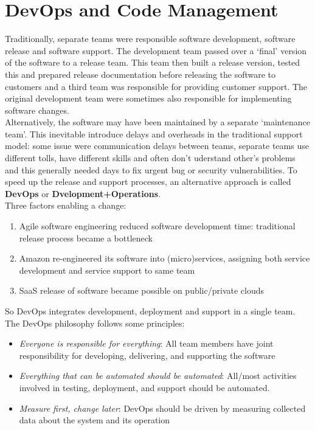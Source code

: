 \documentclass[10pt,a4paper]{report}
\begin{document}
\chapter{DevOps and Code Management}
Traditionally, separate teams were responsible software development, software release and software support.
The development team passed over a ‘final’ version of the software to a release team. This team then built a release version, tested this and prepared release documentation before releasing the software to
customers and a third team was responsible for providing customer support.
The original development team were sometimes also responsible for implementing software changes.
\\
Alternatively, the software may have been maintained by a separate ‘maintenance team’. This inevitable introduce delays and overheads in the traditional support model: some issue were communication delays between teams, separate teams use different tolls, have different skills and often don't uderstand other's problems and this generally needed days to fix urgent bug or security vulnerabilities. To speed up the release and support processes, an alternative approach is called \textbf{DevOps} or \textbf{Dvelopment+Operations}.\\
Three factors enabling a change:
\begin{enumerate}
	\item Agile software engineering reduced software development time: traditional release process became a bottleneck
	\item Amazon re-engineered its software into (micro)services, assigning both service development and service support to same team
	\item SaaS release of software became possible on public/private clouds
\end{enumerate}
So DevOps integrates development, deployment and support in a single team. The DevOps philosophy follows some principles:
\begin{itemize}
	\item \textit{Everyone is responsible for everything}: All team members have joint responsibility for developing, delivering, and supporting the software
	\item \textit{Everything that can be automated should be automated}: All/most activities involved in testing, deployment, and support should 	be automated. 
	\item \textit{Measure first, change later}:	DevOps should be driven by measuring collected data about the system and its operation
\end{itemize}
\end{document}
